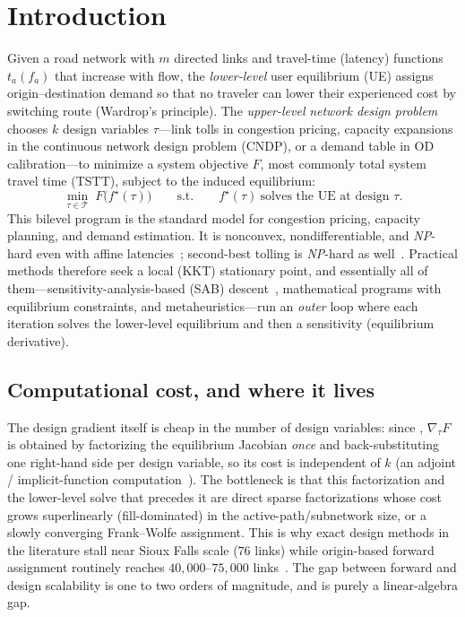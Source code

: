 \documentclass[ijoc]{informs3}
\begin{document}
\maketitle

\section{Introduction}\label{sec:intro}
Given a road network with $m$ directed links and travel-time (latency) functions $t_a(f_a)$ that increase with
flow, the \emph{lower-level} user equilibrium (UE) assigns origin--destination demand so that no traveler can
lower their experienced cost by switching route (Wardrop's principle). The \emph{upper-level} \emph{network
design problem} chooses $k$ design variables $\tau$---link tolls in congestion pricing, capacity expansions in
the continuous network design problem (CNDP), or a demand table in OD calibration---to minimize a system
objective $F$, most commonly total system travel time (TSTT), subject to the induced equilibrium:
\begin{equation}\label{eq:bilevel}
\min_{\tau\in\mathcal{T}}\; F\big(f^\star(\tau)\big)
\qquad\text{s.t.}\qquad f^\star(\tau)\ \text{solves the UE at design }\tau .
\end{equation}
This bilevel program is the standard model for congestion pricing, capacity planning, and demand estimation.
It is nonconvex, nondifferentiable, and \emph{NP}-hard even with affine latencies~\citep{gairing2017}; second-best
tolling is \emph{NP}-hard as well~\citep{hoefer2008}. Practical methods therefore seek a local (KKT) stationary
point, and essentially all of them---sensitivity-analysis-based (SAB) descent~\citep{tobinfriesz1988,jp2007,chiou2005},
mathematical programs with equilibrium constraints, and metaheuristics---run an \emph{outer}
loop where each iteration solves the lower-level equilibrium and then a sensitivity (equilibrium derivative).

\subsection{Computational cost, and where it lives}
The design gradient itself is cheap in the number of design variables: since \citet{tobinfriesz1988}, $\nabla_\tau F$ is obtained by factorizing the equilibrium Jacobian \emph{once}
and back-substituting one right-hand side per design variable, so its cost is independent of $k$ (an adjoint /
implicit-function computation~\citep{jp2007,amos2017,blondel2022}). The bottleneck is that this
factorization and the lower-level solve that precedes it are direct sparse factorizations whose cost grows superlinearly (fill-dominated) in the active-path/subnetwork size, or a slowly converging Frank--Wolfe assignment. This
is why exact design methods in the literature stall near Sioux Falls scale ($76$ links) while origin-based
forward assignment routinely reaches $40,000$--$75,000$ links~\citep{bargera2002,dial2006}. The gap
between forward and design scalability is one to two orders of magnitude, and is purely a linear-algebra gap.
\end{document}
